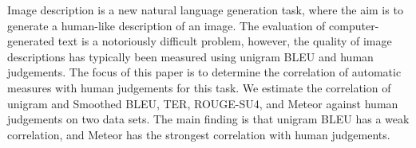 Image description is a new natural language generation task, where the aim is to generate a human-like description of an image. The evaluation of computer-generated text is a notoriously difficult problem, however, the quality of image descriptions has typically been measured using unigram BLEU and human judgements. The focus of this paper is to determine the correlation of automatic measures with human judgements for this task. We estimate the correlation of unigram and Smoothed BLEU, TER, ROUGE-SU4, and Meteor against human judgements on two data sets. The main finding is that unigram BLEU has a weak correlation, and Meteor has the strongest correlation with human judgements.
